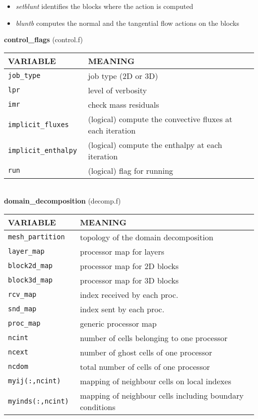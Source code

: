 \begin{itemize}
\item {\em setblunt} identifies the blocks where the action is computed 
\item {\em bluntb} computes the normal and the tangential flow actions on the blocks
\end{itemize}
%
%
{\large {\bf control\_flags}} (control.f)\\[5mm]
\begin{tabular}{|p{6cm}|p{6cm}|}\hline
VARIABLE & MEANING\\\hline
\tt  job\_type    & job type (2D or 3D) \\\hline
\tt  lpr          & level of verbosity \\\hline
\tt  imr          & check mass residuals \\\hline
\tt  implicit\_fluxes   & (logical) compute the convective fluxes at each iteration \\\hline
\tt  implicit\_enthalpy & (logical) compute the enthalpy at each iteration \\\hline
\tt  run                & (logical) flag for running\\\hline
\end{tabular}\\[5mm]
%
%
{\large{\bf domain\_decomposition}} (decomp.f)\\[5mm]
\begin{tabular}{|p{6cm}|p{6cm}|}\hline
VARIABLE & MEANING\\\hline
\tt mesh\_partition   & topology of the domain decomposition\\ \hline
\tt layer\_map   & processor map for layers\\ \hline
\tt block2d\_map & processor map for 2D blocks\\ \hline
\tt block3d\_map & processor map for 3D blocks\\ \hline
\tt rcv\_map   & index received by each proc.\\ \hline
\tt snd\_map & index sent by each proc.\\ \hline
\tt proc\_map & generic processor map\\ \hline
\tt ncint    & number of cells belonging to one processor\\ \hline
\tt ncext    & number of ghost cells of one processor\\ \hline
\tt ncdom    & total number of cells of one processor\\ \hline
\tt myij(:,ncint)   &  mapping of neighbour cells on local indexes\\ \hline
\tt myinds(:,ncint) &  mapping of neighbour cells including boundary conditions\\ \hline
\end{tabular}\\[5mm]
